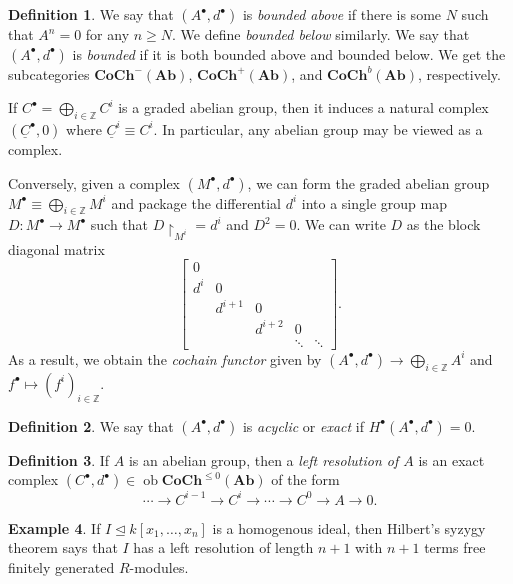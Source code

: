 \documentclass[10pt,letterpaper,cm]{nupset}
\theoremstyle{definition}
\newtheorem{definition}{Definition}[subsection]
\newtheorem{exmp}[definition]{Example}
\theoremstyle{theorem}
\theoremstyle{remark}
\newcommand{\Z}{\mathbb Z}
\newcommand{\1}{\mathbf{1}}
\newcommand{\0}{\vec 0}
\DeclareMathOperator{\ob}{ob}
\begin{document}
\begin{definition}
We say that $(A^{\bullet}, d^{\bullet})$ is \textit{bounded above} if there is some $N$ such that $A^n =0$ for any $n\geq N$. We define \textit{bounded below} similarly. We say that $(A^{\bullet}, d^{\bullet})$ is \textit{bounded} if it is both bounded above and bounded below. We get the subcategories $\mathbf{CoCh}^{{-}}(\mathbf{Ab})$, $\mathbf{CoCh}^{+}(\mathbf{Ab})$, and $\mathbf{CoCh}^{b}(\mathbf{Ab})$, respectively. 
\end{definition}


If $C^{\bullet} = \bigoplus_{i\in \Z} C^i$ is a graded abelian group, then it induces a natural complex $(\underline{C}^{\bullet}, 0)$ where $\underline{C}^i \equiv C^i$. In particular, any abelian group may be viewed as a complex. 

Conversely, given a complex $(M^{\bullet}, d^{\bullet})$, we can form the graded abelian group $M^{\bullet} \equiv  \bigoplus_{i\in \Z} M^i$ and package the differential $d^i$ into a single group map $D: M^{\bullet} \to M^{\bullet}$ such that $D\restriction_{M^i} = d^i$ and $D^2 =0$. We can write $D$ as the block diagonal matrix
$$  \begin{bmatrix} 0 & & &  & \\  d^i &0   &  &  & \\  &  d^{i+1} & 0  &   & \\ &   & d^{i+2}  & 0   &   \\  &  & &  \ddots &   \ddots \end{bmatrix} .$$
As a result, we obtain the \textit{cochain functor} given by $(A^{\bullet}, d^{\bullet}) \to \bigoplus_{i\in \Z} A^i$ and $f^{\bullet} \mapsto (f^i)_{i\in \Z}$.


\begin{definition}
We say that $(A^{\bullet}, d^{\bullet})$ is \textit{acyclic} or \textit{exact} if $H^{\bullet}(A^{\bullet}, d^{\bullet})=0$.
\end{definition}

\begin{definition}
If $A$ is an abelian group, then a \textit{left resolution of $A$} is an exact complex $(C^{\bullet}, d^{\bullet}) \in \ob{\mathbf{CoCh}^{\leq 0}(\mathbf{Ab})}$  of the form $$\cdots \to C^{i-1} \to C^i \to \cdots \to  C^0 \to A \to 0 .$$
\end{definition}

\begin{exmp}
If $I \unlhd k[x_1, \ldots, x_n]$ is a homogenous ideal, then Hilbert's syzygy theorem says that $I$ has a left resolution of length $n+1$ with $n+1$ terms free finitely generated $R$-modules.
\end{exmp}
\end{document}
